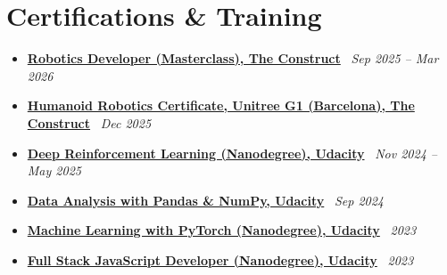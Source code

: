\documentclass[a4paper,11pt]{article}
\newcommand{\resumeCertItem}[2]{
  \item\small{
    \textbf{#1} \textemdash\ \textit{#2}\vspace{-6pt}
  }
}
\newcommand{\resumeSubHeadingListStart}{\begin{itemize}[leftmargin=*]}
\newcommand{\resumeSubHeadingListEnd}{\end{itemize}}
\begin{document}
\section{Certifications \& Training}
  \resumeSubHeadingListStart
    \resumeCertItem{\href{https://app.theconstruct.ai/accomplishments/verify/RIA34BEEEEF7B59/}{Robotics Developer (Masterclass), The Construct}}{Sep 2025 -- Mar 2026}
    \resumeCertItem{\href{https://www.theconstruct.ai/unitree-g1-humanoid-robotics-certificate-training/}{Humanoid Robotics Certificate, Unitree G1 (Barcelona), The Construct}}{Dec 2025}
    \resumeCertItem{\href{https://www.udacity.com/certificate/e/a3bacae8-bb66-11ed-826d-cbcb7e7fecc7}{Deep Reinforcement Learning (Nanodegree), Udacity}}{Nov 2024 -- May 2025}
    \resumeCertItem{\href{https://www.udacity.com/certificate/e/7d6c9ede-5fc5-11ef-b8e4-0bf0243c348f}{Data Analysis with Pandas \& NumPy, Udacity}}{Sep 2024}
    \resumeCertItem{\href{https://www.udacity.com/certificate/e/6c29da6e-75b7-11ed-b96b-671d91689ee6}{Machine Learning with PyTorch (Nanodegree), Udacity}}{2023}
    \resumeCertItem{\href{https://www.udacity.com/certificate/e/9ff0fd60-75b6-11ed-984e-53126f988a5f}{Full Stack JavaScript Developer (Nanodegree), Udacity}}{2023}
\resumeSubHeadingListEnd


\end{document}
